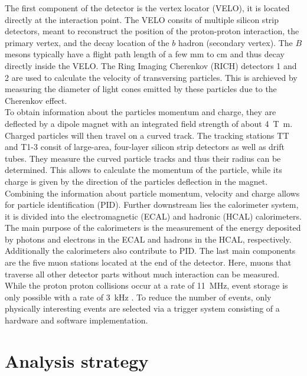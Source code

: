 The first component of the detector is the vertex locator (VELO), it is located directly at the interaction point. The VELO consits of multiple
silicon strip detectors, meant to reconstruct the position of the proton-proton interaction, the primary vertex, and the decay location of the $b$ hadron (secondary vertex).
The $B$ mesons typically have a flight path length of a few $\si{\milli\meter}$ to $\si{\centi\meter}$ and thus decay directly inside the VELO.
The Ring Imaging Cherenkov (RICH) detectors 1 and 2 are used to calculate the velocity of transversing particles. This is archieved by measuring the diameter of light cones emitted by these 
particles due to the Cherenkov effect. \\
To obtain information about the particles momentum and charge, they are deflected by a dipole magnet with an integrated field strength of about \qty{4}{\tesla\meter}. Charged particles
will then travel on a curved track. The tracking stations TT and T1-3 consit of large-area, four-layer silicon strip detectors as well as drift tubes. They measure the
curved particle tracks and thus their radius can be determined. This allows to calculate the momentum of the particle, while its charge is given by the direction of the particles deflection
in the magnet. Combining the information about particle momentum, velocity and charge allows for particle identification (PID).
Further downstream lies the calorimeter system, it is divided into the electromagnetic (ECAL) and hadronic (HCAL) calorimeters.
The main purpose of the calorimeters is the measurement of the energy deposited by photons and electrons in the ECAL and hadrons in the HCAL, respectively.
Additionally the calorimeters also contribute to PID. The last main components are the five muon stations located at the end of the detector. Here, muons that traverse all other
detector parts without much interaction can be measured. \\
While the proton proton collisions occur at a rate of \qty{11}{\mega\hertz}, event storage is only possible with a rate of \qty{3}{\kilo\hertz} \cite{LHCbCPV}. To reduce the
number of events, only physically interesting events are selected via a trigger system consisting of a hardware and software implementation.

\section{Analysis strategy}

